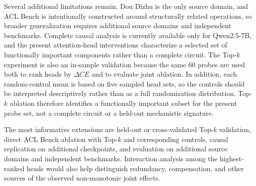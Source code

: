 Several additional limitations remain. Dou Dizhu is the only source domain, and ACL Bench is intentionally constructed around structurally related operations, so broader generalization requires additional source domains and independent benchmarks. Complete causal analysis is currently available only for Qwen2.5-7B, and the present attention-head interventions characterize a selected set of functionally important components rather than a complete circuit. The Top-$k$ experiment is also an in-sample validation because the same 60 probes are used both to rank heads by $\Delta CE$ and to evaluate joint ablation. In addition, each random-control mean is based on five sampled head sets, so the controls should be interpreted descriptively rather than as a full randomization distribution. Top-$k$ ablation therefore identifies a functionally important subset for the present probe set, not a complete circuit or a held-out mechanistic signature.

The most informative extensions are held-out or cross-validated Top-$k$ validation, direct ACL Bench ablation with Top-$k$ and corresponding controls, causal replication on additional checkpoints, and evaluation on additional source domains and independent benchmarks. Interaction analysis among the highest-ranked heads would also help distinguish redundancy, compensation, and other sources of the observed non-monotonic joint effects.



